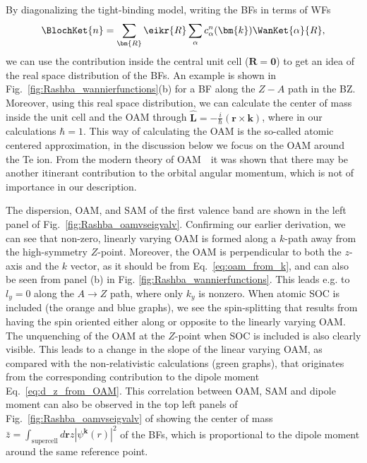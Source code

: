 By diagonalizing the tight-binding model, writing the BFs in terms of WFs
\begin{equation}
	\BlochKet{n} = \sum_{\bm{R}} \eikr{R} \sum_{\alpha} c_{\alpha}^n(\bm{k}) \WanKet{\alpha}{R},
\end{equation}
we can use the contribution inside the central unit cell ($\bm{R} = \bm{0}$) to get an idea of the real space distribution of the BFs.
An example is shown in Fig.~\ref{fig:Rashba_wannierfunctions}(b) for a BF along the $Z-A$ path in the BZ.
Moreover, using this real space distribution, we can calculate the center of mass inside the unit cell and the OAM through $\hat{\bm{L}} = -\frac{i}{\hbar} (\bm{r} \times \bm{k})$, where in our calculations $\hbar = 1$.
This way of calculating the OAM is the so-called atomic centered approximation, in the discussion below we focus on the OAM around the Te ion.
From the modern theory of OAM~\cite{Thonhauser2011}~it was shown that there may be another itinerant contribution to the orbital angular momentum, which is not of importance in our description. 

\begin{figure*}[h]
\centering
{}
\caption{\label{fig:Rashba_oamvseigvalv}Comparison between the real-space observables and energy dispersion in (a) the first and (b) third valence band. The values are plotted in function of the relative distance from the $Z$ point $\bm{k}_r = \bm{k} - \bm{k}_Z$, towards the A and U points. The green graphs denote the values before turning on atomic SOC, whereas the orange and blue graphs denote the two spin-split bands.}
\end{figure*}

The dispersion, OAM, and SAM of the first valence band are shown in the left panel of Fig.~\ref{fig:Rashba_oamvseigvalv}. 
Confirming our earlier derivation, we can see that non-zero, linearly varying OAM is formed along a $k$-path away from the high-symmetry $Z$-point.
Moreover, the OAM is perpendicular to both the $z$-axis and the $k$ vector, as it should be from Eq.~\ref{eq:oam_from_k}, and can also be seen from panel (b) in Fig. \ref{fig:Rashba_wannierfunctions}.
This leads e.g. to $l_y=0$ along the $A \to Z$ path, where only $k_y$ is nonzero.
When atomic SOC is included (the orange and blue graphs), we see the spin-splitting that results from having the spin oriented either along or opposite to the linearly varying OAM.
The unquenching of the OAM at the $Z$-point when SOC is included is also clearly visible.
This leads to a change in the slope of the linear varying OAM, as compared with the non-relativistic calculations (green graphs), that originates from the corresponding contribution to the dipole moment Eq.~\ref{eq:d_z_from_OAM}.
This correlation between OAM, SAM and dipole moment can also be observed in the top left panels of Fig.~\ref{fig:Rashba_oamvseigvalv} of showing the center of mass $\bar{z}=\int_{\textrm{supercell}}d \bm{r} z |\psi^{\bm{k}}(r)|^2$ of the BFs, which is proportional to the dipole moment around the same reference point.


